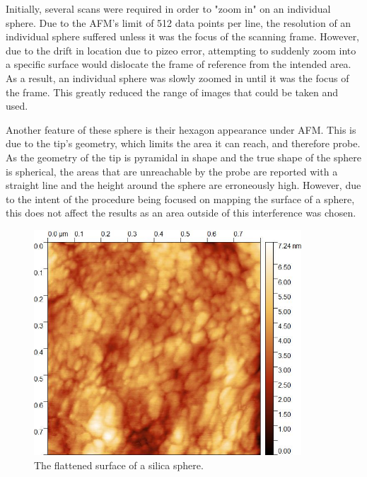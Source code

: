 Initially, several scans were required in order to "zoom in" on an individual sphere. Due to the AFM's limit of 512 data points per line, the resolution of an individual sphere suffered unless it was the focus of the scanning frame. However, due to the drift in location due to pizeo error, attempting to suddenly zoom into a specific surface would dislocate the frame of reference from the intended area. As a result, an individual sphere was slowly zoomed in until it was the focus of the frame. This greatly reduced the range of images that could be taken and used.

Another feature of these sphere is their hexagon appearance under AFM. This is due to the tip's geometry, which limits the area it can reach, and therefore probe. As the geometry of the tip is pyramidal in shape and the true shape of the sphere is spherical, the areas that are unreachable by the probe are reported with a straight line and the height around the sphere are erroneously high. However, due to the intent of the procedure being focused on mapping the surface of a sphere, this does not affect the results as an area outside of this interference was chosen.



\begin{figure}[h]     %
        \begin{center}
          \includegraphics[width=100mm]{chapter3/Sphere3.jpg}
\end{center}
\caption{The flattened surface of a silica sphere.}
\label{fig:SiliSph2}                 %
\end{figure}

